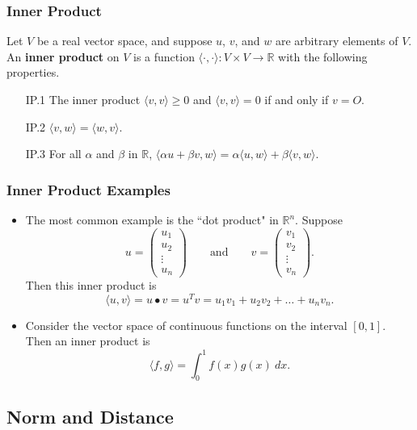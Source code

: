 \documentclass{beamer}
\begin{document}
\begin{frame}
\frametitle{Inner Product}

\begin{Definition}
Let $V$ be a real vector space, and suppose $u$, $v$, and $w$ are arbitrary elements of $V$. An {\bf inner product} on $V$ is a function $\langle\cdot ,\cdot\rangle:V\times V\to \mathbb{R}$ with the following properties.
\begin{enumerate}
\item[IP.1] The inner product $\langle v, v\rangle \geq 0$ and $\langle v, v\rangle = 0$ if and only if $v = O$.
\item[IP.2] $\langle v, w\rangle = \langle w, v\rangle$.
\item[IP.3] For all $\alpha$ and $\beta$ in $\mathbb{R}$,
$\langle \alpha u + \beta v, w\rangle= \alpha \langle u, w\rangle + \beta \langle v, w\rangle.$
\end{enumerate}
\end{Definition}

\end{frame}

\begin{frame}
\frametitle{Inner Product Examples}
{\small 
\begin{itemize}
\item The most common example is the ``dot product" in $\mathbb{R}^n$. Suppose
$$
u = \left(\begin{array}{c} u_1\\ u_2\\ \vdots\\ u_n\end{array}\right)\qquad\text{and}\qquad v = \left(\begin{array}{c} v_1\\ v_2\\ \vdots\\ v_n\end{array}\right).
$$
Then this inner product is
$$
\langle u, v\rangle = u \bullet v =  u^T v = u_1v_1 + u_2v_2 +\ldots + u_n v_n.
$$
\item Consider the vector space of continuous functions on the interval $[0, 1]$. Then an inner product is
$$
\langle f, g\rangle = \int_0^1 f(x) g(x)\ dx.
$$
\end{itemize}
}

\end{frame}

\subsection{Norm and Distance}
\end{document}
